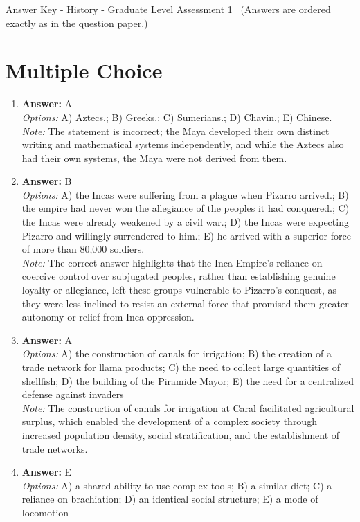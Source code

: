 \documentclass[12pt]{article}
\begin{document}
\begin{center}
Answer Key - History - Graduate Level Assessment 1 \
\small (Answers are ordered exactly as in the question paper.)
\end{center}

\section*{Multiple Choice}
\begin{enumerate}[label=\arabic*.]
\item \textbf{Answer:} A
\\ \textit{Options:} A) Aztecs.; B) Greeks.; C) Sumerians.; D) Chavin.; E) Chinese.
\\ \textit{Note:} The statement is incorrect; the Maya developed their own distinct writing and mathematical systems independently, and while the Aztecs also had their own systems, the Maya were not derived from them.
\item \textbf{Answer:} B
\\ \textit{Options:} A) the Incas were suffering from a plague when Pizarro arrived.; B) the empire had never won the allegiance of the peoples it had conquered.; C) the Incas were already weakened by a civil war.; D) the Incas were expecting Pizarro and willingly surrendered to him.; E) he arrived with a superior force of more than 80,000 soldiers.
\\ \textit{Note:} The correct answer highlights that the Inca Empire's reliance on coercive control over subjugated peoples, rather than establishing genuine loyalty or allegiance, left these groups vulnerable to Pizarro's conquest, as they were less inclined to resist an external force that promised them greater autonomy or relief from Inca oppression.
\item \textbf{Answer:} A
\\ \textit{Options:} A) the construction of canals for irrigation; B) the creation of a trade network for llama products; C) the need to collect large quantities of shellfish; D) the building of the Piramide Mayor; E) the need for a centralized defense against invaders
\\ \textit{Note:} The construction of canals for irrigation at Caral facilitated agricultural surplus, which enabled the development of a complex society through increased population density, social stratification, and the establishment of trade networks.
\item \textbf{Answer:} E
\\ \textit{Options:} A) a shared ability to use complex tools; B) a similar diet; C) a reliance on brachiation; D) an identical social structure; E) a mode of locomotion

\end{enumerate}
\end{document}

